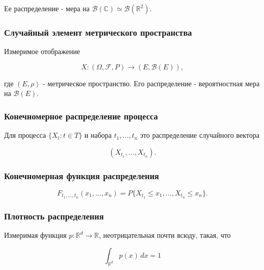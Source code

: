 \documentclass[
  11pt,
  a4paper,
]{article}
\begin{document}
Ее распределение - мера на
\(\mathcal B(\mathbb C)\simeq\mathcal B(\mathbb R^2)\).

\subsubsection{Случайный элемент метрического
пространства}\label{ux441ux43bux443ux447ux430ux439ux43dux44bux439-ux44dux43bux435ux43cux435ux43dux442-ux43cux435ux442ux440ux438ux447ux435ux441ux43aux43eux433ux43e-ux43fux440ux43eux441ux442ux440ux430ux43dux441ux442ux432ux430}

Измеримое отображение

\[
X:(\Omega,\mathcal F,P)\to(E,\mathcal B(E)),
\]

где \((E,\rho)\) - метрическое пространство. Его распределение -
вероятностная мера на \(\mathcal B(E)\).

\subsubsection{Конечномерное распределение
процесса}\label{ux43aux43eux43dux435ux447ux43dux43eux43cux435ux440ux43dux43eux435-ux440ux430ux441ux43fux440ux435ux434ux435ux43bux435ux43dux438ux435-ux43fux440ux43eux446ux435ux441ux441ux430}

Для процесса \(\{X_t:t\in T\}\) и набора \(t_1,\ldots,t_n\) это
распределение случайного вектора

\[
(X_{t_1},\ldots,X_{t_n}).
\]

\subsubsection{Конечномерная функция
распределения}\label{ux43aux43eux43dux435ux447ux43dux43eux43cux435ux440ux43dux430ux44f-ux444ux443ux43dux43aux446ux438ux44f-ux440ux430ux441ux43fux440ux435ux434ux435ux43bux435ux43dux438ux44f}

\[
F_{t_1,\ldots,t_n}(x_1,\ldots,x_n)
=
P\{X_{t_1}\le x_1,\ldots,X_{t_n}\le x_n\}.
\]

\subsubsection{Плотность
распределения}\label{ux43fux43bux43eux442ux43dux43eux441ux442ux44c-ux440ux430ux441ux43fux440ux435ux434ux435ux43bux435ux43dux438ux44f}

Измеримая функция \(p:\mathbb R^d\to\mathbb R\), неотрицательная почти
всюду, такая, что

\[
\int_{\mathbb R^d}p(x)\,dx=1
\]
\end{document}
